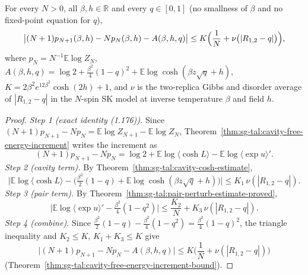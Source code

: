 \begin{theorem}
\label{thm:sg-tal:prop-168}
  \leanok
{}
For every $N>0$, all $\beta,h\in\mathbb R$ and every $q\in[0,1]$ (no smallness of $\beta$ and no fixed-point
equation for $q$),
\[
 \bigl|(N+1)p_{N+1}(\beta,h)-Np_N(\beta,h)-A(\beta,h,q)\bigr|\le K\Bigl(\frac1N+\nu\bigl(|R_{1,2}-q|\bigr)\Bigr),
\]
where $p_N=N^{-1}\mathbb E\log Z_N$, $A(\beta,h,q)=\log2+\frac{\beta^2}4(1-q)^2+\mathbb E\log\cosh(\beta z\sqrt q+h)$,
$K=2\beta^2e^{12\beta^2}\cosh(2h)+1$, and $\nu$ is the two-replica Gibbs and disorder average of
$|R_{1,2}-q|$ in the $N$-spin SK model at inverse temperature $\beta$ and field $h$.
\end{theorem}
\begin{proof}
  \leanok
\emph{Step 1 (exact identity (1.176)).} Since $(N+1)p_{N+1}-Np_N=\mathbb E\log Z_{N+1}-\mathbb E\log Z_N$, Theorem~\ref{thm:sg-tal:cavity-free-energy-increment} writes the increment as
\[
(N+1)p_{N+1}-Np_N=\log2+\mathbb E\log\langle\cosh L\rangle-\mathbb E\log\langle\exp u\rangle' .
\]
\emph{Step 2 (cavity term).} By Theorem~\ref{thm:sg-tal:cavity-cosh-estimate},
\[
\Big|\mathbb E\log\langle\cosh L\rangle-\Big(\tfrac{\beta^2}2(1-q)+\mathbb E\log\cosh(\beta z\sqrt q+h)\Big)\Big|\le K_1\,\nu(|R_{1,2}-q|).
\]
\emph{Step 3 (pair term).} By Theorem~\ref{thm:sg-tal:pair-perturb-estimate-proved},
\[
\Big|\mathbb E\log\langle\exp u\rangle'-\tfrac{\beta^2}4(1-q^2)\Big|\le\frac{K_2}N+K_3\,\nu(|R_{1,2}-q|).
\]
\emph{Step 4 (combine).} Since $\frac{\beta^2}2(1-q)-\frac{\beta^2}4(1-q^2)=\frac{\beta^2}4(1-q)^2$, the triangle inequality and $K_2\le K$, $K_1+K_3\le K$ give
\[
\Big|(N+1)p_{N+1}-Np_N-A(\beta,h,q)\Big|\le K\Big(\frac1N+\nu(|R_{1,2}-q|)\Big)
\]
(Theorem~\ref{thm:sg-tal:cavity-free-energy-increment-bound}).
\end{proof}

